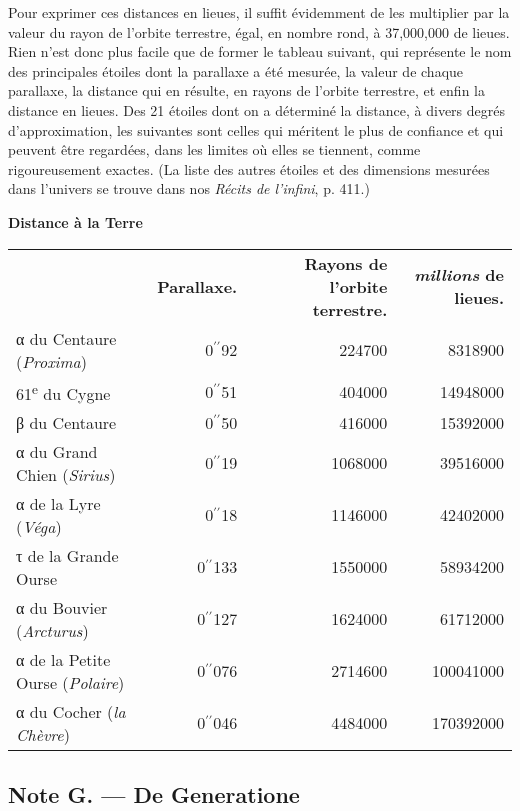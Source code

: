 \documentclass[a4paper, 11pt, oneside]{article}
\begin{document}
Pour exprimer ces distances en lieues, il suffit évidemment de les multiplier par la valeur du rayon de l'orbite terrestre, égal, en nombre rond, à 37,000,000 de lieues. Rien n'est donc plus facile que de former le tableau suivant, qui représente le nom des principales étoiles dont la parallaxe a été mesurée, la valeur de chaque parallaxe, la distance qui en résulte, en rayons de l'orbite terrestre, et enfin la distance en lieues. Des 21 étoiles dont on a déterminé la distance, à divers degrés d'approximation, les suivantes sont celles qui méritent le plus de confiance et qui peuvent être regardées, dans les limites où elles se tiennent, comme rigoureusement exactes. (La liste des autres étoiles et des dimensions mesurées dans l'univers se trouve dans nos \emph{Récits de l'infini}, p. 411.)
\begin{center}
\textbf{Distance à la Terre}
\end{center}
\begin{table}[H]
    \centering
    \footnotesize
    \begin{tabular}{l r r r}
        ~ & \textbf{Parallaxe.} & \textbf{Rayons de l'orbite terrestre.} & \textbf{\emph{millions} de lieues.} \\
        α du Centaure (\emph{Proxima}) & 0$^{\prime\prime}$92 & 224700 & 8318900 \\
        61\textsuperscript{e} du Cygne & 0$^{\prime\prime}$51 & 404000 & 14948000 \\
        β du Centaure & 0$^{\prime\prime}$50 & 416000 & 15392000 \\
        α du Grand Chien (\emph{Sirius}) & 0$^{\prime\prime}$19 & 1068000 & 39516000 \\
        α de la Lyre (\emph{Véga}) & 0$^{\prime\prime}$18 & 1146000 & 42402000 \\
        τ de la Grande Ourse & 0$^{\prime\prime}$133 & 1550000 & 58934200 \\
        α du Bouvier (\emph{Arcturus}) & 0$^{\prime\prime}$127 & 1624000 & 61712000 \\
        α de la Petite Ourse (\emph{Polaire}) & 0$^{\prime\prime}$076 & 2714600 & 100041000 \\
        α du Cocher (\emph{la Chèvre}) & 0$^{\prime\prime}$046 & 4484000 & 170392000 \\
    \end{tabular}
\end{table}
\clearpage
\subsection{Note G. --- De Generatione}
\end{document}
